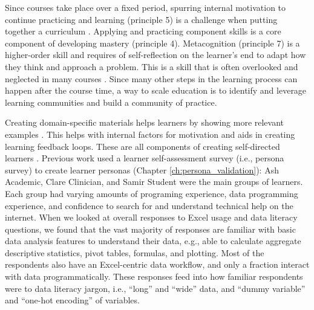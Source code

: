\documentclass[030-workshop.tex]{subfiles}
\begin{document}
    Since courses take place over a fixed period,
    spurring internal motivation to continue practicing and learning (principle 5) is a challenge when putting together a curriculum
    \cite{ambrose2010learning}.
    Applying and practicing component skills is a core component of developing mastery (principle 4).
    Metacognition (principle 7) is a higher-order skill and requires of self-reflection on the learner's end
    to adapt how they think and approach a problem.
    This is a skill that is often overlooked and neglected in many courses
    \cite{ambrose2010learning}.
    Since many other steps in the learning process can happen after the course time,
    a way to scale education is to identify and leverage learning communities
    and build a community of practice. %

    Creating domain-specific materials helps learners by showing more relevant examples
    \cite{ambrose2010learning, Koch2016, wilson2019teaching, krossDemocratizationDataScience2020}.
    This helps with internal factors for motivation and aids in creating learning feedback loops.
    These are all components of creating self-directed learners
    \cite{ambrose2010learning, Koch2016, wilson2019teaching, krossDemocratizationDataScience2020}.
    Previous work used a learner self-assessment survey (i.e., persona survey) to create learner personas
    (Chapter \ref{ch:persona_validation}):
    Ash Academic, Clare Clinician, and Samir Student were the main groups of learners.
    Each group had varying amounts of
    programing experience, data programming experience, and
    confidence to search for and understand technical help on the internet.
    When we looked at overall responses to Excel usage and data literacy questions,
    we found that the vast majority of responses are familiar with basic data analysis features to understand their data,
    e.g., able to calculate aggregate descriptive statistics,
    pivot tables,
    formulas,
    and plotting. %
    Most of the respondents also have an Excel-centric data workflow,
    and only a fraction interact with data programmatically. %
    These responses feed into how familiar respondents were to data literacy jargon, i.e., ``long'' and ``wide'' data,
    and ``dummy variable'' and ``one-hot encoding'' of variables.
\end{document}
